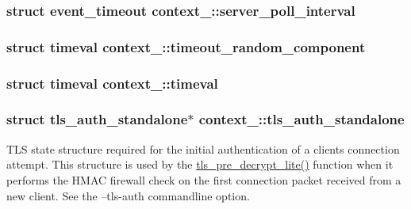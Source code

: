 \subsubsection[{server\+\_\+poll\+\_\+interval}]{\setlength{\rightskip}{0pt plus 5cm}struct {\bf event\+\_\+timeout} context\+\_\+::server\+\_\+poll\+\_\+interval}\label{structcontext__2_a1aeeedd8cd4780c69f7626bcb81f4b90}
\hypertarget{structcontext__2_a3da875f012e28a84b4464dc6e8b91177}{}
\subsubsection[{timeout\+\_\+random\+\_\+component}]{\setlength{\rightskip}{0pt plus 5cm}struct {\bf timeval} context\+\_\+::timeout\+\_\+random\+\_\+component}\label{structcontext__2_a3da875f012e28a84b4464dc6e8b91177}
\hypertarget{structcontext__2_acbdb92043997a7c13406b3ee83e3beb2}{}
\subsubsection[{timeval}]{\setlength{\rightskip}{0pt plus 5cm}struct timeval context\+\_\+::timeval}\label{structcontext__2_acbdb92043997a7c13406b3ee83e3beb2}
\hypertarget{structcontext__2_a5504671bac689290cd35901bf7d031aa}{}
\subsubsection[{tls\+\_\+auth\+\_\+standalone}]{\setlength{\rightskip}{0pt plus 5cm}struct {\bf tls\+\_\+auth\+\_\+standalone}$\ast$ context\+\_\+::tls\+\_\+auth\+\_\+standalone}\label{structcontext__2_a5504671bac689290cd35901bf7d031aa}
T\+L\+S state structure required for the initial authentication of a client\textquotesingle{}s connection attempt. This structure is used by the {\ttfamily \hyperlink{group__data__crypto_gab1369f42e94bbec108d952d565b0f283}{tls\+\_\+pre\+\_\+decrypt\+\_\+lite()}} function when it performs the H\+M\+A\+C firewall check on the first connection packet received from a new client. See the {\ttfamily --tls-\/auth} commandline option. \hypertarget{structcontext__2_aea6f45bc37c7c473a4ba3871d43ea2d5}{}
